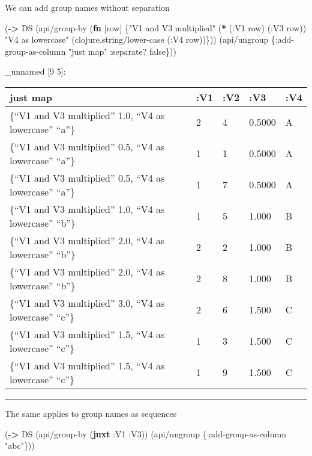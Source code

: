 \documentclass[]{article}
\newenvironment{Shaded}{\begin{snugshade}}{\end{snugshade}}
\newcommand{\KeywordTok}[1]{\textcolor[rgb]{0.13,0.29,0.53}{\textbf{#1}}}
\newcommand{\StringTok}[1]{\textcolor[rgb]{0.31,0.60,0.02}{#1}}
\newcommand{\VariableTok}[1]{\textcolor[rgb]{0.00,0.00,0.00}{#1}}
\newcommand{\AttributeTok}[1]{\textcolor[rgb]{0.77,0.63,0.00}{#1}}
\newcommand{\NormalTok}[1]{#1}
\begin{document}
We can add group names without separation

\begin{Shaded}
\begin{Highlighting}[]
\NormalTok{(}\KeywordTok{->}\NormalTok{ DS}
\NormalTok{    (api/group-by (}\KeywordTok{fn}\NormalTok{ [row] \{}\StringTok{"V1 and V3 multiplied"}\NormalTok{ (}\KeywordTok{*}\NormalTok{ (}\AttributeTok{:V1}\NormalTok{ row)}
\NormalTok{                                                      (}\AttributeTok{:V3}\NormalTok{ row))}
                            \StringTok{"V4 as lowercase"}\NormalTok{ (clojure.string/lower-case (}\AttributeTok{:V4}\NormalTok{ row))\}))}
\NormalTok{    (api/ungroup \{}\AttributeTok{:add-group-as-column} \StringTok{"just map"}
                  \AttributeTok{:separate}\NormalTok{? }\VariableTok{false}\NormalTok{\}))}
\end{Highlighting}
\end{Shaded}

\_unnamed {[}9 5{]}:

\begin{longtable}[]{@{}lllll@{}}
\toprule
just map & :V1 & :V2 & :V3 & :V4\tabularnewline
\midrule
\endhead
\{``V1 and V3 multiplied'' 1.0, ``V4 as lowercase'' ``a''\} & 2 & 4 &
0.5000 & A\tabularnewline
\{``V1 and V3 multiplied'' 0.5, ``V4 as lowercase'' ``a''\} & 1 & 1 &
0.5000 & A\tabularnewline
\{``V1 and V3 multiplied'' 0.5, ``V4 as lowercase'' ``a''\} & 1 & 7 &
0.5000 & A\tabularnewline
\{``V1 and V3 multiplied'' 1.0, ``V4 as lowercase'' ``b''\} & 1 & 5 &
1.000 & B\tabularnewline
\{``V1 and V3 multiplied'' 2.0, ``V4 as lowercase'' ``b''\} & 2 & 2 &
1.000 & B\tabularnewline
\{``V1 and V3 multiplied'' 2.0, ``V4 as lowercase'' ``b''\} & 2 & 8 &
1.000 & B\tabularnewline
\{``V1 and V3 multiplied'' 3.0, ``V4 as lowercase'' ``c''\} & 2 & 6 &
1.500 & C\tabularnewline
\{``V1 and V3 multiplied'' 1.5, ``V4 as lowercase'' ``c''\} & 1 & 3 &
1.500 & C\tabularnewline
\{``V1 and V3 multiplied'' 1.5, ``V4 as lowercase'' ``c''\} & 1 & 9 &
1.500 & C\tabularnewline
\bottomrule
\end{longtable}

\begin{center}\rule{0.5\linewidth}{0.5pt}\end{center}

The same applies to group names as sequences

\begin{Shaded}
\begin{Highlighting}[]
\NormalTok{(}\KeywordTok{->}\NormalTok{ DS}
\NormalTok{    (api/group-by (}\KeywordTok{juxt} \AttributeTok{:V1} \AttributeTok{:V3}\NormalTok{))}
\NormalTok{    (api/ungroup \{}\AttributeTok{:add-group-as-column} \StringTok{"abc"}\NormalTok{\}))}
\end{Highlighting}
\end{Shaded}
\end{document}
